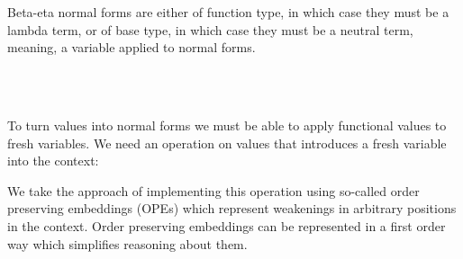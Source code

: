 \documentclass[preliminary,copyright,creativecommons]{eptcs}
\newenvironment{code}{\verbatim}{\endverbatim}
\begin{document}
Beta-eta normal forms are either of function type, in which case they
must be a lambda term, or of base type, in which case they must be a
neutral term, meaning, a variable applied to normal forms.

\begin{code}\>  \AgdaSymbol{(} \AgdaSymbol{:} \AgdaSymbol{)} \AgdaSymbol{:}    \<\\
\>[0]\<[2]\>[2] \<[7]\>[7]\AgdaSymbol{:}  \AgdaSymbol{\}} \<[17]\>[17]\AgdaSymbol{(} \<[21]\>[21]\AgdaSymbol{:}  \AgdaSymbol{(} \AgdaInductiveConstructor{,} \AgdaSymbol{)} \AgdaSymbol{)} \<[38]\>[38]   \AgdaSymbol{(}  \AgdaSymbol{)}\<\\
\>[0]\<[2]\>[2] \<[7]\>[7]\AgdaSymbol{:} \<[17]\>[17]\AgdaSymbol{(} \<[21]\>[21]\AgdaSymbol{:}    \AgdaSymbol{)} \<[38]\>[38]   \<\end{code}

\noindent
To turn values into normal forms we must be able to apply functional
values to fresh variables.  We need an operation on values that
introduces a fresh variable into the context:

\begin{code}\> \AgdaSymbol{:}   \AgdaSymbol{\}}       \AgdaSymbol{(} \AgdaInductiveConstructor{,} \AgdaSymbol{)} \<\end{code}

\noindent
We take the approach of implementing this operation using so-called
order preserving embeddings (OPEs) which represent weakenings in
arbitrary positions in the context. Order preserving embeddings can be
represented in a first order way which simplifies reasoning about
them.
\end{document}
